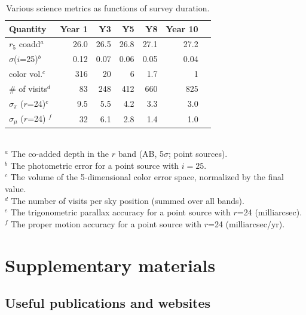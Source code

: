 \documentclass[DM,toc,usenatbib]{lsstdoc}
\begin{document}
\begin{table}[h!]
\caption{Various science metrics as functions of survey duration.}
\begin{tabular}{|l|r|r|r|r|r|r|}
\hline     
          Quantity                          &     Year 1   &    Y3  &     Y5  &     Y8   &     Year 10   \\
\hline  
    $r_5$ coadd$^a$                   &       26.0    &      26.5   &      26.8    &      27.1    &          27.2     \\
    $\sigma$($i$=25)$^b$         &     0.12    &     0.07    &      0.06    &    0.05      &        0.04        \\     
    color vol.$^c$                        &       316     &       20     &        6      &    1.7        &           1       \\
     \# of visits$^d$                    &          83     &     248     &      412     &    660      &          825      \\  
    $\sigma_\pi$ ($r$=24)$^e$   &        9.5     &      5.5     &        4.2    &     3.3       &          3.0      \\ 
    $\sigma_\mu$ ($r$=24) $^f$  &  32   &      6.1    &     2.8   &     1.4   &     1.0     \\
\hline                         
\end{tabular}
\\ \vskip 0.05in
$^a$ The co-added depth in the $r$ band (AB, 5$\sigma$; point sources).  \\
$^b$ The photometric error for a point source with $i=25$. \\
$^c$ The volume of the 5-dimensional color error space, normalized by the final value. \\
$^d$ The number of visits per sky position (summed over all bands). \\
$^e$ The trigonometric parallax accuracy for a point source with $r$=24 (milliarcsec). \\ 
$^f$  The proper motion accuracy for a point source with $r$=24 (milliarcsec/yr).  \\
\end{table}


\newpage
\section{Supplementary materials \label{sec:supp}} 
\label{append:supplemental}

\subsection{Useful publications and websites \label{sec:pubs}}
\end{document}
